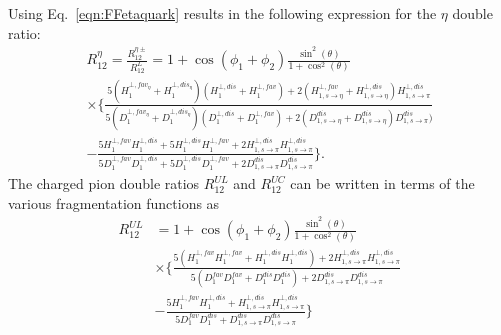 \documentclass[aps,prX,preprint,groupedaddress,linenumbers]{revtex4-1}
\begin{document}
Using Eq.~\eqref{eqn:FFetaquark} results in the following expression for the \(\eta\) double ratio:
\begin{multline}
R_{12}^{\eta}=\frac{R^{\eta\pm}_{12}}{R^L_{12}}=1+\cos(\phi_1+\phi_2)\frac{\sin^2(\theta)}{1+\cos^2(\theta)} \\
\times\bigg\{\frac{5(H^{\bot,fav_\eta}_1+H^{\bot,dis_\eta}_1)(H^{\bot,dis}_1+H^{\bot,fav}_1)+2(H^{\bot,fav}_{1,s\rightarrow\eta}+H^{\bot,dis}_{1,s\rightarrow\eta})H^{\bot,dis}_{1,s\rightarrow\pi}}{5(D^{\bot,fav_\eta}_1+D^{\bot,dis_\eta}_1)(D^{\bot,dis}_1+D^{\bot,fav}_1)+2(D^{dis}_{1,s\rightarrow\eta}+D^{dis}_{1,s\rightarrow\eta})D^{dis}_{1,s\rightarrow\pi})}\\
-\frac{5H^{\bot,fav}_1H^{\bot,dis}_1+5H^{\bot,dis}_1H^{\bot,fav}_1+2H^{\bot,dis}_{1,s\rightarrow\pi}H^{\bot,dis}_{1,s\rightarrow\pi}}{5D^{\bot,fav}_1D^{\bot,dis}_1+5D^{\bot,dis}_1D^{\bot,fav}_1+2D^{dis}_{1,s\rightarrow\pi}D^{dis}_{1,s\rightarrow\pi}} \bigg\}.
\label{eqn:FF5eta}
\end{multline}
The charged pion double ratios $R^{UL}_{12}$ and $R^{UC}_{12}$ can be written in terms of the various fragmentation functions as
%
\begin{equation}
\begin{aligned}
R^{UL}_{12}&=1+\cos(\phi_1+\phi_2)\frac{\sin^2(\theta)}{1+\cos^2(\theta)}\\
&\times\bigg\{\frac{5(H^{\bot,fav}_1H^{\bot,fav}_1+H^{\bot,dis}_1H^{\bot,dis}_1)+2H^{\bot,dis}_{1,s\rightarrow\pi}H^{\bot,dis}_{1,s\rightarrow\pi}}{5(D^{fav}_1D^{fav}_1+D^{dis}_1 D^{dis}_1)+2D^{dis}_{1,s\rightarrow\pi}D^{dis}_{1,s\rightarrow\pi}}\\
&-\frac{5H^{\bot,fav}_1 H^{\bot,dis}_1+H^{\bot,dis}_{1,s\rightarrow\pi}H^{\bot,dis}_{1,s\rightarrow\pi}}{5D^{fav}_1D^{dis}_1 +D^{dis}_{1,s\rightarrow\pi}D^{dis}_{1,s\rightarrow\pi}} \bigg\} 
\end{aligned}
\label{eqn:allratiosexpress2}
\end{equation}
\end{document}
